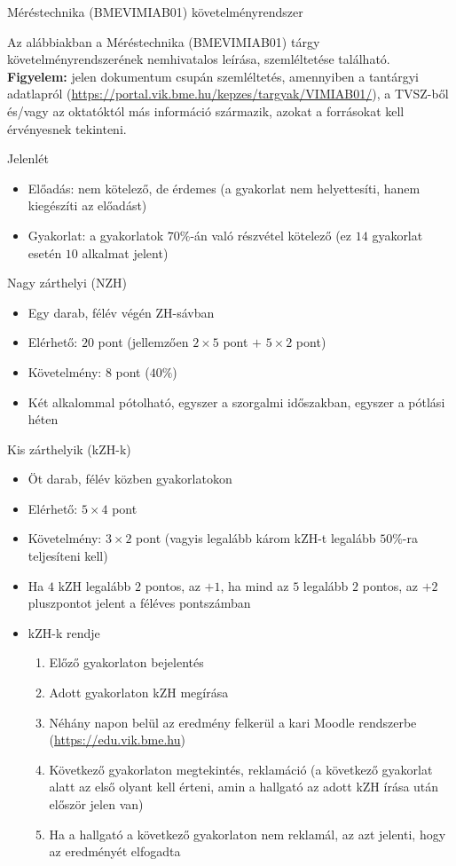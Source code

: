 \documentclass[a4paper,12pt]{article}
\begin{document}
	\begin{center}
		\LARGE Méréstechnika (BMEVIMIAB01) követelményrendszer
	\end{center}
	Az alábbiakban a Méréstechnika (BMEVIMIAB01) tárgy követelményrendszerének nemhivatalos leírása, szemléltetése található. \textbf{Figyelem:} jelen dokumentum csupán szemléltetés, amennyiben a tantárgyi adatlapról (\url{https://portal.vik.bme.hu/kepzes/targyak/VIMIAB01/}), a TVSZ-ből és/vagy az oktatóktól más információ származik, azokat a forrásokat kell érvényesnek tekinteni.
	
	Jelenlét
	\begin{itemize}
		\item Előadás: nem kötelező, de érdemes (a gyakorlat nem helyettesíti, hanem kiegészíti az előadást)
		\item Gyakorlat: a gyakorlatok $70\%$-án való részvétel kötelező (ez $14$ gyakorlat esetén $10$ alkalmat jelent)
	\end{itemize}
	Nagy zárthelyi (NZH)
	\begin{itemize}
		\item Egy darab, félév végén ZH-sávban
		\item Elérhető: $20$ pont (jellemzően $2\times5$ pont $+$ $5\times2$ pont)
		\item Követelmény: $8$ pont ($40\%$)
		\item Két alkalommal pótolható, egyszer a szorgalmi időszakban, egyszer a pótlási héten
	\end{itemize}
	Kis zárthelyik (kZH-k)
	\begin{itemize}
		\item Öt darab, félév közben gyakorlatokon
		\item Elérhető: $5\times4$ pont
		\item Követelmény: $3\times2$ pont (vagyis legalább károm kZH-t legalább $50\%$-ra teljesíteni kell)
		\item Ha $4$ kZH legalább $2$ pontos, az $+1$, ha mind az $5$ legalább $2$ pontos, az $+2$ pluszpontot jelent a féléves pontszámban
		\item kZH-k rendje
		\begin{enumerate}
			\item Előző gyakorlaton bejelentés
			\item Adott gyakorlaton kZH megírása
			\item Néhány napon belül az eredmény felkerül a kari Moodle rendszerbe (\url{https://edu.vik.bme.hu})
			\item Következő gyakorlaton megtekintés, reklamáció (a következő gyakorlat alatt az első olyant kell érteni, amin a hallgató az adott kZH írása után először jelen van)
			\item Ha a hallgató a következő gyakorlaton nem reklamál, az azt jelenti, hogy az eredményét elfogadta
		\end{enumerate}
	\end{itemize}
\end{document}
